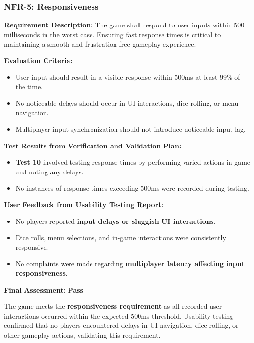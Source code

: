 \documentclass[12pt, titlepage]{article}
\begin{document}
\subsubsection{NFR-5: Responsiveness}
\label{NFR5}

\textbf{Requirement Description:}  
The game shall respond to user inputs within 500 milliseconds in the worst case. Ensuring fast response times is critical to maintaining a smooth and frustration-free gameplay experience.

\textbf{Evaluation Criteria:}  
\begin{itemize}
    \item User input should result in a visible response within 500ms at least 99\% of the time.
    \item No noticeable delays should occur in UI interactions, dice rolling, or menu navigation.
    \item Multiplayer input synchronization should not introduce noticeable input lag.
\end{itemize}

\textbf{Test Results from Verification and Validation Plan:}  
\begin{itemize}
    \item \textbf{Test 10} involved testing response times by performing varied actions in-game and noting any delays.
    \item No instances of response times exceeding 500ms were recorded during testing.
\end{itemize}

\textbf{User Feedback from Usability Testing Report:}  
\begin{itemize}
    \item No players reported \textbf{input delays or sluggish UI interactions}.
    \item Dice rolls, menu selections, and in-game interactions were consistently responsive.
    \item No complaints were made regarding \textbf{multiplayer latency affecting input responsiveness}.
\end{itemize}

\textbf{Final Assessment:} \textbf{Pass}  

The game meets the \textbf{responsiveness requirement} as all recorded user interactions occurred within the expected 500ms threshold. Usability testing confirmed that no players encountered delays in UI navigation, dice rolling, or other gameplay actions, validating this requirement.
\end{document}
